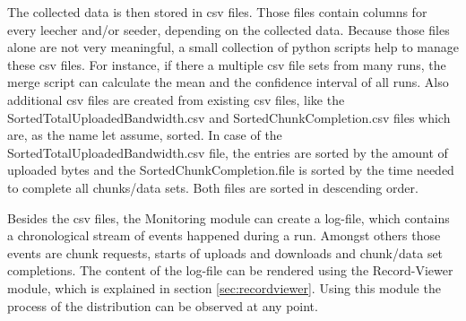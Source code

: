 The collected data is then stored in csv files. Those files contain columns for every leecher and/or seeder, depending on the collected data. Because those files alone are not very meaningful, a small collection of python scripts help to manage these csv files. For instance, if there a multiple csv file sets from many runs, the merge script can calculate the mean and the confidence interval of all runs. Also additional csv files are created from existing csv files, like the SortedTotalUploadedBandwidth.csv and SortedChunkCompletion.csv files which are, as the name let assume, sorted. In case of the SortedTotalUploadedBandwidth.csv file, the entries are sorted by the amount of uploaded bytes and the SortedChunkCompletion.file is sorted by the time needed to complete all chunks/data sets. Both files are sorted in descending order.

Besides the csv files, the Monitoring module can create a log-file, which contains a chronological stream of events happened during a run. Amongst others those events are chunk requests, starts of uploads and downloads and chunk/data set completions. The content of the log-file can be rendered using the Record-Viewer module, which is explained in section \ref{sec:recordviewer}. Using this module the process of the distribution can be observed at any point.
